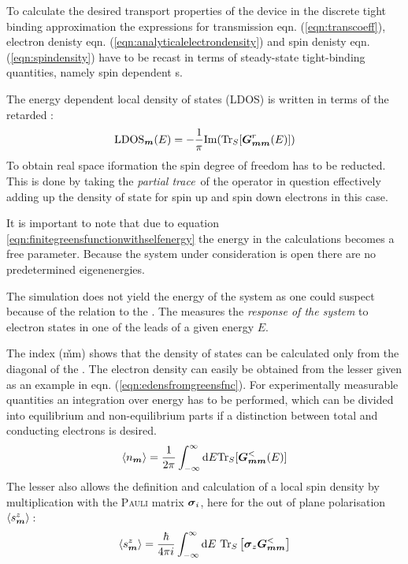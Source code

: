 To calculate the desired transport properties of the device in the discrete tight binding approximation the expressions for transmission eqn. (\ref{eqn:transcoeff}), electron denisty eqn. (\ref{eqn:analyticalelectrondensity}) and spin denisty eqn. (\ref{eqn:spindensity}) have to be recast in terms of steady-state tight-binding quantities, namely spin dependent \gfnc s.\par
The energy dependent local density of states (LDOS) is written in terms of the retarded \gfnc{}\cite{AnLunNik2008}:
\begin{align}
\text{LDOS}_{\boldsymbol{m}}(E)=-\frac{1}{\pi} \text{Im}(\text{Tr}_S[\boldsymbol{G}_{\boldsymbol{mm}}^r(E)])
\label{eqn:ldos}
\end{align}
To obtain real space iformation the spin degree of freedom has to be reducted. This is done by taking the \emph{partial trace}\,\cite{Jacobs} of the operator in question effectively adding up the density of state for spin up and spin down electrons in this case.\par
It is important to note that due to equation \ref{eqn:finitegreensfunctionwithselfenergy} the energy in the calculations becomes a free parameter.  Because the system under consideration is open there are no predetermined eigenenergies.\par
The simulation does not yield the energy of the system as one could suspect because of the relation to the \sdg{}. The \gfnc{} measures the \emph{response of the system} to electron states in one of the leads of a given energy $E$.\par
The index (\v{mm}) shows that the density of states can be calculated only from the diagonal of the \gfnc{}.
The electron density can easily be obtained from the lesser \gfnc{} given as an example in eqn. (\ref{eqn:edensfromgreensfnc}). For experimentally measurable quantities an integration over energy has to be performed, which can be divided into equilibrium and non-equilibrium parts if a distinction between total and conducting electrons is desired.
\begin{align}
	\left< n_{\boldsymbol{m}} \right> = \frac{1}{2\pi} \int_{-\infty}^{\infty}\text{d}E\text{Tr}_S[\boldsymbol{G}_{\boldsymbol{mm}}^<(E)]
	\label{eqn:gfncdensity}
\end{align}
The lesser \gfnc{} also allows the definition and calculation  of a local spin density by multiplication with the \textsc{Pauli} matrix $\boldsymbol{\sigma}_i$, here for the out of plane polarisation $\left< s^z_{\boldsymbol{m}} \right>$\,\cite{Wimmer2009Thesis}:
\begin{align}
\left< s^z_{\boldsymbol{m}} \right> = \frac{\hbar}{4 \pi i} \int^{\infty}_{-\infty}\text{d}E\text{ Tr}_S\left[\boldsymbol{\sigma}_z\boldsymbol{G}^<_{\boldsymbol{mm}}\right]
\label{eqn:gfncspindensity}
\end{align}
